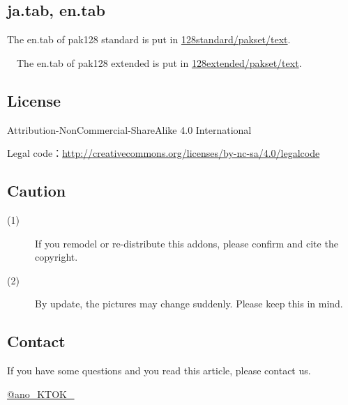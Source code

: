 \documentclass{jarticle}
\begin{document}
\subsection*{ja.tab, en.tab}
 The en.tab of pak128 standard is put in \href{https://github.com/anoKTOK/Yokubari_roads_set_ver_anoKTOK/tree/main/128standard/pakset/text}{128standard/pakset/text}.

 　The en.tab of pak128 extended is put in \href{https://github.com/anoKTOK/Yokubari_roads_set_ver_anoKTOK/tree/main/128extended/pakset/text}{128extended/pakset/text}.


\subsection*{License}
Attribution-NonCommercial-ShareAlike 4.0 International

Legal code：\href{http://creativecommons.org/licenses/by-nc-sa/4.0/legalcode}{http://creativecommons.org/licenses/by-nc-sa/4.0/legalcode}


\subsection*{Caution}

\begin{description}
  \item[(1)]
    If you remodel or re-distribute this addons, please confirm and cite the copyright.
  \item[(2)]
    By update, the pictures may change suddenly. Please keep this in mind.
\end{description}

\subsection*{Contact}

If you have some questions and
you read this article,
please contact us.

\href{https://twitter.com/ano_KTOK_}{@ano\_KTOK\_}

\newpage
\end{document}
